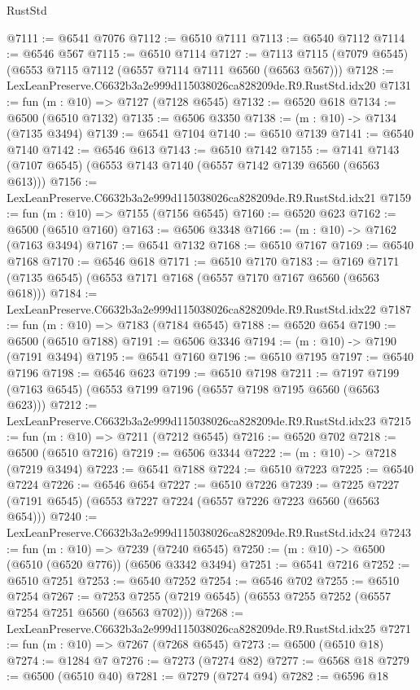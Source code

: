 \begin{lexlean}{RustStd}
\begin{coremodule}
@7111 := @6541 @7076
@7112 := @6510 @7111
@7113 := @6540 @7112
@7114 := @6546 @567
@7115 := @6510 @7114
@7127 := @7113 @7115 (@7079 @6545) (@6553 @7115 @7112 (@6557 @7114 @7111 @6560 (@6563 @567)))
@7128 := LexLeanPreserve.C6632b3a2e999d115038026ca828209de.R9.RustStd.idx20
@7131 := fun (m : @10) => @7127 (@7128 @6545)
@7132 := @6520 @618
@7134 := @6500 (@6510 @7132)
@7135 := @6506 @3350
@7138 := (m : @10) -> @7134 (@7135 @3494)
@7139 := @6541 @7104
@7140 := @6510 @7139
@7141 := @6540 @7140
@7142 := @6546 @613
@7143 := @6510 @7142
@7155 := @7141 @7143 (@7107 @6545) (@6553 @7143 @7140 (@6557 @7142 @7139 @6560 (@6563 @613)))
@7156 := LexLeanPreserve.C6632b3a2e999d115038026ca828209de.R9.RustStd.idx21
@7159 := fun (m : @10) => @7155 (@7156 @6545)
@7160 := @6520 @623
@7162 := @6500 (@6510 @7160)
@7163 := @6506 @3348
@7166 := (m : @10) -> @7162 (@7163 @3494)
@7167 := @6541 @7132
@7168 := @6510 @7167
@7169 := @6540 @7168
@7170 := @6546 @618
@7171 := @6510 @7170
@7183 := @7169 @7171 (@7135 @6545) (@6553 @7171 @7168 (@6557 @7170 @7167 @6560 (@6563 @618)))
@7184 := LexLeanPreserve.C6632b3a2e999d115038026ca828209de.R9.RustStd.idx22
@7187 := fun (m : @10) => @7183 (@7184 @6545)
@7188 := @6520 @654
@7190 := @6500 (@6510 @7188)
@7191 := @6506 @3346
@7194 := (m : @10) -> @7190 (@7191 @3494)
@7195 := @6541 @7160
@7196 := @6510 @7195
@7197 := @6540 @7196
@7198 := @6546 @623
@7199 := @6510 @7198
@7211 := @7197 @7199 (@7163 @6545) (@6553 @7199 @7196 (@6557 @7198 @7195 @6560 (@6563 @623)))
@7212 := LexLeanPreserve.C6632b3a2e999d115038026ca828209de.R9.RustStd.idx23
@7215 := fun (m : @10) => @7211 (@7212 @6545)
@7216 := @6520 @702
@7218 := @6500 (@6510 @7216)
@7219 := @6506 @3344
@7222 := (m : @10) -> @7218 (@7219 @3494)
@7223 := @6541 @7188
@7224 := @6510 @7223
@7225 := @6540 @7224
@7226 := @6546 @654
@7227 := @6510 @7226
@7239 := @7225 @7227 (@7191 @6545) (@6553 @7227 @7224 (@6557 @7226 @7223 @6560 (@6563 @654)))
@7240 := LexLeanPreserve.C6632b3a2e999d115038026ca828209de.R9.RustStd.idx24
@7243 := fun (m : @10) => @7239 (@7240 @6545)
@7250 := (m : @10) -> @6500 (@6510 (@6520 @776)) (@6506 @3342 @3494)
@7251 := @6541 @7216
@7252 := @6510 @7251
@7253 := @6540 @7252
@7254 := @6546 @702
@7255 := @6510 @7254
@7267 := @7253 @7255 (@7219 @6545) (@6553 @7255 @7252 (@6557 @7254 @7251 @6560 (@6563 @702)))
@7268 := LexLeanPreserve.C6632b3a2e999d115038026ca828209de.R9.RustStd.idx25
@7271 := fun (m : @10) => @7267 (@7268 @6545)
@7273 := @6500 (@6510 @18)
@7274 := @1284 @7
@7276 := @7273 (@7274 @82)
@7277 := @6568 @18
@7279 := @6500 (@6510 @40)
@7281 := @7279 (@7274 @94)
@7282 := @6596 @18

\end{coremodule}
\end{lexlean}
